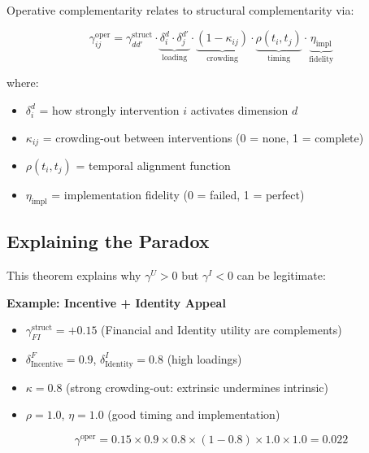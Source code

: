 \begin{theorem}
\label{thm:gtc-bridge}

Operative complementarity relates to structural complementarity via:

\begin{equation}
\boxed{
\gamma^{\text{oper}}_{ij} = \gamma^{\text{struct}}_{dd'} \cdot \underbrace{\delta_i^d \cdot \delta_j^{d'}}_{\text{loading}} \cdot \underbrace{(1 - \kappa_{ij})}_{\text{crowding}} \cdot \underbrace{\rho(t_i, t_j)}_{\text{timing}} \cdot \underbrace{\eta_{\text{impl}}}_{\text{fidelity}}
}
\end{equation}

where:
\begin{itemize}[nosep]
    \item $\delta_i^d$ = how strongly intervention $i$ activates dimension $d$
    \item $\kappa_{ij}$ = crowding-out between interventions (0 = none, 1 = complete)
    \item $\rho(t_i, t_j)$ = temporal alignment function
    \item $\eta_{\text{impl}}$ = implementation fidelity (0 = failed, 1 = perfect)
\end{itemize}

\end{theorem}

\subsection{Explaining the Paradox}

This theorem explains why $\gamma^U > 0$ but $\gamma^I < 0$ can be legitimate:

\textbf{Example: Incentive + Identity Appeal}

\begin{itemize}
    \item $\gamma^{\text{struct}}_{FI} = +0.15$ (Financial and Identity utility are complements)
    \item $\delta_{\text{Incentive}}^F = 0.9$, $\delta_{\text{Identity}}^I = 0.8$ (high loadings)
    \item $\kappa = 0.8$ (strong crowding-out: extrinsic undermines intrinsic)
    \item $\rho = 1.0$, $\eta = 1.0$ (good timing and implementation)
\end{itemize}

\begin{equation}
\gamma^{\text{oper}} = 0.15 \times 0.9 \times 0.8 \times (1 - 0.8) \times 1.0 \times 1.0 = 0.022
\end{equation}

